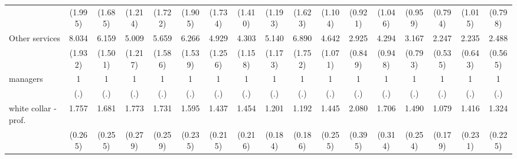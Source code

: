 {\begin{tabular}{l*{16}{c}}
                    &     (1.995)         &     (1.685)         &     (1.214)         &     (1.722)         &     (1.905)         &     (1.734)         &     (1.410)         &     (1.193)         &     (1.623)         &     (1.104)         &     (0.921)         &     (1.046)         &     (0.959)         &     (0.794)         &     (1.015)         &     (0.798)         \\
[1em]
Other services      &       8.034\sym{***}&       6.159\sym{***}&       5.009\sym{***}&       5.659\sym{***}&       6.266\sym{***}&       4.929\sym{***}&       4.303\sym{***}&       5.140\sym{***}&       6.890\sym{***}&       4.642\sym{***}&       2.925\sym{***}&       4.294\sym{***}&       3.167\sym{***}&       2.247\sym{***}&       2.235\sym{**} &       2.488\sym{***}\\
                    &     (1.932)         &     (1.501)         &     (1.217)         &     (1.586)         &     (1.539)         &     (1.256)         &     (1.158)         &     (1.173)         &     (1.752)         &     (1.071)         &     (0.849)         &     (0.948)         &     (0.793)         &     (0.535)         &     (0.643)         &     (0.565)         \\
[1em]
managers            &           1         &           1         &           1         &           1         &           1         &           1         &           1         &           1         &           1         &           1         &           1         &           1         &           1         &           1         &           1         &           1         \\
                    &         (.)         &         (.)         &         (.)         &         (.)         &         (.)         &         (.)         &         (.)         &         (.)         &         (.)         &         (.)         &         (.)         &         (.)         &         (.)         &         (.)         &         (.)         &         (.)         \\
[1em]
white collar - prof.&       1.757\sym{***}&       1.681\sym{***}&       1.773\sym{***}&       1.731\sym{***}&       1.595\sym{**} &       1.437\sym{*}  &       1.454\sym{*}  &       1.201         &       1.192         &       1.445\sym{*}  &       2.080\sym{***}&       1.706\sym{**} &       1.490\sym{*}  &       1.079         &       1.416\sym{*}  &       1.324         \\
                    &     (0.265)         &     (0.255)         &     (0.279)         &     (0.259)         &     (0.235)         &     (0.215)         &     (0.216)         &     (0.184)         &     (0.186)         &     (0.255)         &     (0.395)         &     (0.314)         &     (0.254)         &     (0.179)         &     (0.231)         &     (0.225)         \\

\end{tabular}}
